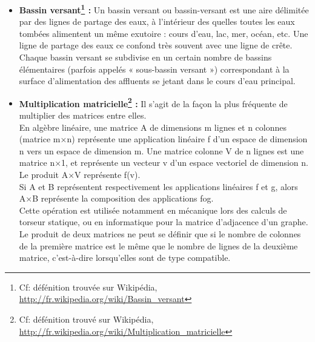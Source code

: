 \begin{itemize}
	\item{\textbf{Bassin versant\footnote{Cf: défénition trouvée sur Wikipédia, \url{http://fr.wikipedia.org/wiki/Bassin_versant}} :} Un bassin versant ou bassin-versant est une aire délimitée par des lignes de partage des eaux, à l'intérieur des quelles toutes les eaux tombées alimentent un même exutoire : cours d'eau, lac, mer, océan, etc. Une ligne de partage des eaux ce confond très souvent avec une ligne de crête.\\

	Chaque bassin versant se subdivise en un certain nombre de bassins élémentaires (parfois appelés « sous-bassin versant ») correspondant à la surface d'alimentation des affluents se jetant dans le cours d'eau principal.\\}

	\item{\textbf{Multiplication matricielle\footnote{Cf: défénition trouvé sur Wikipédia, \url{http://fr.wikipedia.org/wiki/Multiplication_matricielle}} :} Il s'agit de la façon la plus fréquente de multiplier des matrices entre elles.\\
	En algèbre linéaire, une matrice A de dimensions m lignes et n colonnes (matrice m×n) représente une application linéaire f d'un espace de dimension n vers un espace de dimension m. Une matrice colonne V de n lignes est une matrice n×1, et représente un vecteur v d'un espace vectoriel de dimension n. Le produit A×V représente f(v).\\
	Si A et B représentent respectivement les applications linéaires f et g, alors A×B représente la composition des applications fog.\\
	Cette opération est utilisée notamment en mécanique lors des calculs de torseur statique, ou en informatique pour la matrice d'adjacence d'un graphe. \\
	Le produit de deux matrices ne peut se définir que si le nombre de colonnes de la première matrice est le même que le nombre de lignes de la deuxième matrice, c'est-à-dire lorsqu'elles sont de type compatible. \\}


\end{itemize}
